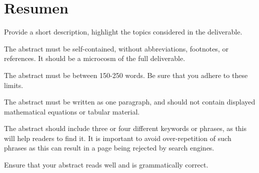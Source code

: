 \section*{Resumen}
Provide a short description, highlight the topics considered in the deliverable.

The abstract must be self-contained, without abbreviations, footnotes, or references. It should be a microcosm of the full deliverable.

The abstract must be between 150-250 words. Be sure that you adhere to these limits.

The abstract must be written as one paragraph, and should not contain displayed mathematical equations or tabular material.

The abstract should include three or four different keywords or phrases, as this will help readers to find it. It is important to avoid over-repetition of such phrases as this can result in a page being rejected by search engines.

Ensure that your abstract reads well and is grammatically correct.
\clearpage


